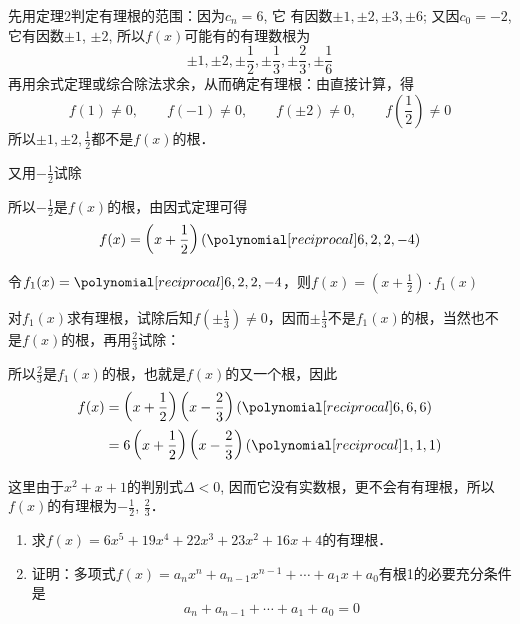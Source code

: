 \begin{solution}
    先用定理2判定有理根的范围：因为$c_n=6$, 它
    有因数$\pm 1,\pm 2,\pm 3,\pm 6$; 又因$c_0=-2$, 它有因数$\pm 1$, 
$\pm 2$, 所以$f(x)$可能有的有理数根为
\[\pm 1, \pm 2, \pm \frac{1}{2}, \pm \frac{1}{3}, \pm \frac{2}{3}, \pm \frac{1}{6}\]
再用余式定理或综合除法求余，从而确定有理根：由直接计算，得
\[f(1)\ne 0,\qquad f(-1)\ne 0,\qquad f(\pm 2)\ne 0,\qquad f\left(\frac{1}{2}\right)\ne 0\]
所以$\pm 1,\pm 2,\frac{1}{2}$都不是$f(x)$的根．

又用$-\frac{1}{2}$试除
\begin{center}
\end{center}
所以$-\frac{1}{2}$是$f(x)$的根，由因式定理可得
\[f(x)=\left(x+\frac{1}{2}\right)(\poly{6,2,2,-4})\]

令$f_1(x)=\poly{6,2,2,-4}$，则$f(x)=\left(x+\frac{1}{2}\right)\cdot f_1(x)$

对$f_1(x)$求有理根，试除后知$f\left(\pm\frac{1}{3}\right)\ne 0$，因而$\pm\frac{1}{3}$不是$f_1(x)$的根，当然也不是$f(x)$的根，再用$\frac{2}{3}$试除：
\begin{center}
\end{center}
所以$\frac{2}{3}$是$f_1(x)$的根，也就是$f(x)$的又一个根，因此
\[\begin{split}
    f(x)&=\left(x+\frac{1}{2}\right)\left(x-\frac{2}{3}\right)(\poly{6,6,6})\\
    &=6\left(x+\frac{1}{2}\right)\left(x-\frac{2}{3}\right)(\poly{1,1,1})
\end{split}\]

这里由于$x^2+x+1$的判别式$\Delta<0$, 因而它没有实数根，更不会有有理根，所以$f(x)$的有理根为$-\frac{1}{2}$, $\frac{2}{3}$．
\end{solution}

\begin{ex}
\begin{enumerate}
    \item 求$f(x)=6x^5+19x^4+22x^3+23x^2+16x+4$的有理根．
    \item 证明：多项式$f(x)=a_nx^n+a_{n-1}x^{n-1}+\cdots+a_1x+a_0$有根1的必要充分条件是
    \[ a_n+a_{n-1}+\cdots +a_1+a_0=0\]
\end{enumerate}
\end{ex}

